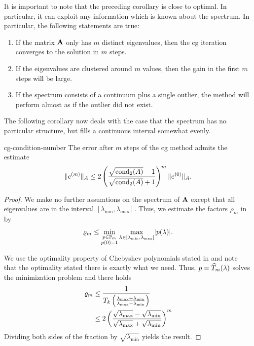 \begin{remark}
  It is important to note that the preceding corollary is close to
  optimal. In particular, it can exploit any information which is
  known about the spectrum. In particular, the following statements are true:
  \begin{enumerate}
  \item If the matrix $\mathbf A$ only has $m$ distinct eigenvalues, then
    the cg iteration converges to the solution in $m$ steps.
  \item If the eigenvalues are clustered around $m$ values, then the
    gain in the first $m$ steps will be large.
  \item If the spectrum consists of a continuum plus a single outlier,
    the method will perform almost as if the outlier did not exist.
  \end{enumerate}
  The following corollary now deals with the case that the spectrum
  has no particular structure, but fills a continuous interval
  somewhat evenly.
\end{remark}

\begin{Corollary}{cg-condition-number}
  The error after $m$ steps of the cg method admits the estimate
  \begin{gather}
    \lVert e^{(m)}\rVert_A \le 2 \left(
      \frac{\sqrt{\operatorname{cond}_2(A)}-1}{\sqrt{\operatorname{cond}_2(A)}+1}\right)^m
    \lVert e^{(0)}\rVert_A.
  \end{gather}
\end{Corollary}

\begin{proof}
  We make no further assumtions on the spectrum of $\mathbf A$ except that
  all eigenvalues are in the interval
  $[\lambda_{\min},\lambda_{\max}]$. Thus, we estimate the factors $\rho_m$ in  by
  \begin{gather}
    \varrho_m \le \min_{\substack{p\in\mathbb P_m\\p(0) = 1}}
    \max_{\lambda\in[\lambda_{\min},\lambda_{\max}]} \lvert p(\lambda)\rvert.
  \end{gather}
  
  We use the optimality property of Chebyshev polynomials stated in
   and note that the
  optimality stated there is exactly what we need. Thus,
  $p = \widehat{T}_m(\lambda)$ solves the minimization
  problem and there holds
  \begin{align}
    \varrho_m
    &\le \frac1{T_k\left(
      \frac{\lambda_{\max}+\lambda_{\min}}{\lambda_{\max}-\lambda_{\min}}
      \right)}\\
    & \le 2 \left(\frac{\sqrt{\lambda_{\max}}-\sqrt{\lambda_{\min}}}{\sqrt{\lambda_{\max}}+\sqrt{\lambda_{\min}}}
      \right)^m
  \end{align}
  Dividing both sides of the fraction by $\sqrt{\lambda_{\min}}$ yields the result.
\end{proof}

